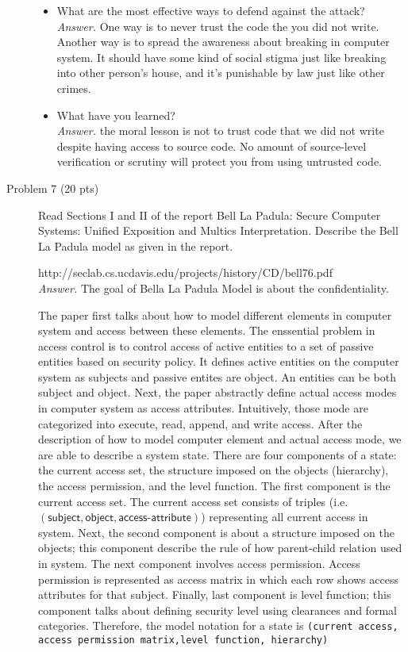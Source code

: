 \documentclass[11pt]{article}
\begin{document}
\begin{description}
\begin{itemize}
	\item What are the most effective ways to defend against the attack? 
	\\\textit{Answer. } One way is to never trust the code the you did not write. Another way is to spread the awareness about breaking in computer system. It should have some kind of social stigma just like breaking into other person's house, and it's punishable by law just like other crimes.
	\item What have you learned?
	\\\textit{Answer. } the moral lesson is not to trust code that we did not write despite having access to source code. No amount of source-level verification or scrutiny will protect you from using untrusted code.
\end{itemize}
 \item[Problem 7 (20 pts) ]
Read Sections I and II of the report Bell La Padula: Secure Computer Systems: Unified Exposition and Multics Interpretation.  Describe the Bell La Padula model as given in the report.

http://seclab.cs.ucdavis.edu/projects/history/CD/bell76.pdf
\\
\textit{Answer. } The goal of Bella La Padula Model is about the confidentiality.  

The paper first talks about how to model different elements in computer system and access between these elements. The enssential problem in access control is to control access of active entities to a set of passive entities based on security policy. It defines active entities on the computer system as subjects and passive entites are object. An entities can be both subject and object. Next, the paper abstractly define actual access modes in computer system as access attributes. Intuitively, those mode are categorized into execute, read, append, and write access. After the description of how to model computer element and actual access mode, we are able to describe a system state. There are four components of a state: the current access set, the structure imposed on the objects (hierarchy), the access permission, and the level function. The first component is the current access set. The current access set consists of triples (i.e. $\mathsf{(subject, object, access\text{-}attribute)}$) representing all current access in system. Next, the second component is about a structure imposed on the objects; this component describe the rule of how parent-child relation used in system. The next component involves access permission. Access permission is represented as access matrix in which each row shows access attributes for that subject. Finally, last component is level function; this component talks about defining security level using clearances and formal categories. Therefore, the model notation for a state is {\tt ({current access}, access permission matrix,}{\tt level function, hierarchy)}


\end{description}
\end{document}
